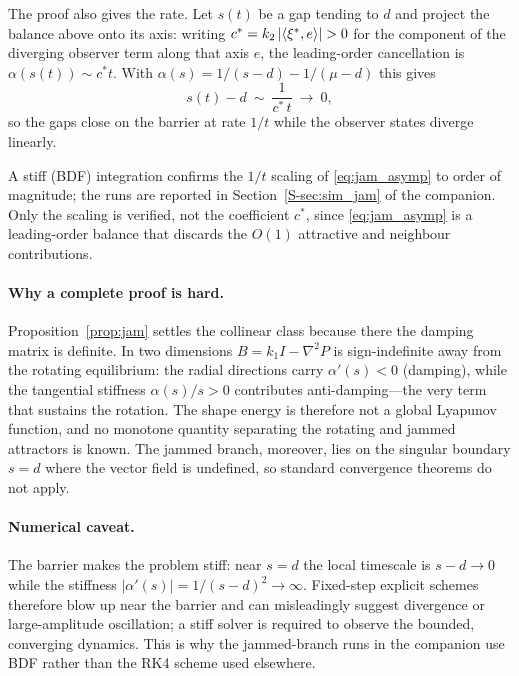 \begin{remark}
The proof also gives the rate. Let $s(t)$ be a gap tending to $d$ and project the balance above onto
its axis: writing $c^*=k_2\abs{\langle\xi^*,e\rangle}>0$ for the component of the diverging observer
term along that axis $e$, the leading-order cancellation is $\alpha(s(t))\sim c^*t$. With
$\alpha(s)=1/(s-d)-1/(\mu-d)$ this gives
\begin{equation}
  s(t)-d\ \sim\ \frac{1}{c^*\,t}\ \longrightarrow\ 0 ,
  \label{eq:jam_asymp}
\end{equation}
so the gaps close on the barrier at rate $1/t$ while the observer states diverge linearly.
\end{remark}

A stiff (BDF) integration confirms the $1/t$ scaling of \eqref{eq:jam_asymp} to order of magnitude; the
runs are reported in Section~\ref{S-sec:sim_jam} of the companion. Only the scaling is verified, not the
coefficient $c^*$, since \eqref{eq:jam_asymp} is a leading-order balance that discards the $O(1)$
attractive and neighbour contributions.

\paragraph{Why a complete proof is hard.} Proposition~\ref{prop:jam} settles the collinear class
because there the damping matrix is definite. In two dimensions $B=k_1I-\nabla^2P$ is sign-indefinite
away from the rotating equilibrium: the radial directions carry $\alpha'(s)<0$ (damping), while the
tangential stiffness $\alpha(s)/s>0$ contributes anti-damping---the very term that sustains the
rotation. The shape energy is therefore not a global Lyapunov function, and no monotone quantity
separating the rotating and jammed attractors is known. The jammed branch, moreover, lies on the
singular boundary $s=d$ where the vector field is undefined, so standard convergence theorems do not
apply.

\paragraph{Numerical caveat.} The barrier makes the problem stiff: near $s=d$ the local timescale is
$s-d\to0$ while the stiffness $|\alpha'(s)|=1/(s-d)^2\to\infty$. Fixed-step explicit schemes therefore
blow up near the barrier and can misleadingly suggest divergence or large-amplitude oscillation; a
stiff solver is required to observe the bounded, converging dynamics. This is why the jammed-branch
runs in the companion use BDF rather than the RK4 scheme used elsewhere.


